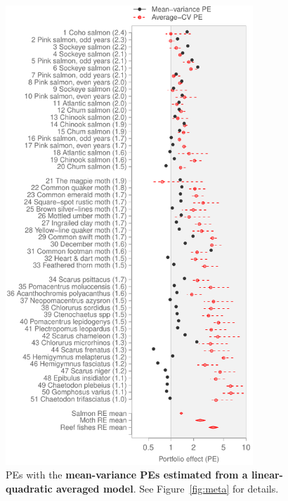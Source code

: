 \begin{figure}[htbp]
  \centering
  \includegraphics[height=6.8in]{prophets/PE_comparison_z_meta_taxa_lin_quad_avg_20121214.pdf}
  \caption[PEs with the mean-variance PEs estimated from a
      linear-quadratic averaged model.]{PEs with the \textbf{mean-variance PEs estimated from a
      linear-quadratic averaged model}. See Figure~\ref{fig:meta} for details.}
\label{fig:meta-lin-quad-avg}
\end{figure}

